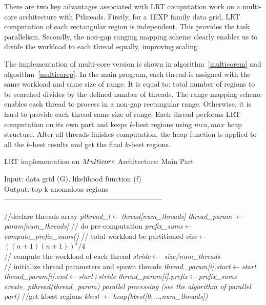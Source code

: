 \documentclass[AMA,LATO1COL]{WileyNJD-v2}
\begin{document}
There are two key advantages associated with LRT computation work on a multi-core architecture with Pthreads. Firstly, for a 1EXP family data grid, LRT computation of each rectangular region is independent. This provides the task parallelism. Secondly, the non-gap ranging mapping scheme clearly enables us to divide the workload to each thread equally, improving scaling.

The implementation of multi-core version is shown in algorithm~\ref{multicorem} and algorithm~\ref{multicorep}. In the main program, each thread is assigned with the same workload and same size of range. It is equal to: total number of regions to be searched divides by the defined number of threads. The range mapping scheme enables each thread to process in a non-gap rectangular range. Otherwise, it is hard to provide each thread same size of range. Each thread performs LRT computation on its own part and keeps $k$-best regions using $min, max$ heap structure. After all threads finishes computation, the heap function is applied to all the $k$-best results and get the final $k$-best regions.

\begin{algorithm}[t!]
\caption{LRT implementation on $Multi\-core$ Architecture: Main Part}\label{multicorem}
Input: data grid (G), likelihood function (f)\\
Output: top k anomalous regions\\
------------------------------------------------------------------ \\
\begin{algorithmic}[1]

\State //declare threads array
\State \textit  {pthread\_t\(\leftarrow\)thread[num\_threads]}
\State \textit  {thread\_param \(\leftarrow\)param[num\_threads]}
\State // do pre-computation
\State \textit  {prefix\_sums\(\leftarrow\)compute\_prefix\_sums()}
\State // total workload be partitioned
\State \textit  {size\(\leftarrow\) ${((n+1)(n+1))^2/4}$\\}
\State // compute the workload of each thread
\State \textit  {stride\(\leftarrow\) {size/num\_threads}\\}
\State // initialize thread parameters and spawn threads
\State \textit {thread\_param[i].start\(\leftarrow\)start}
\State \textit {thread\_param[i].end\(\leftarrow\)start+stride}
\State \textit {thread\_param[i].prefix\(\leftarrow\)prefix\_sums}
\State \textit {create\_pthread(thread\_param)}
\EndFor
\State \textit {parallel processing (see the algorithm of parallel part)}
\State //get kbest regions
\State \textit {kbest \(\leftarrow\)heap(kbest[0,...,num\_threads])}
\end{algorithmic}
\end{algorithm}
\end{document}
